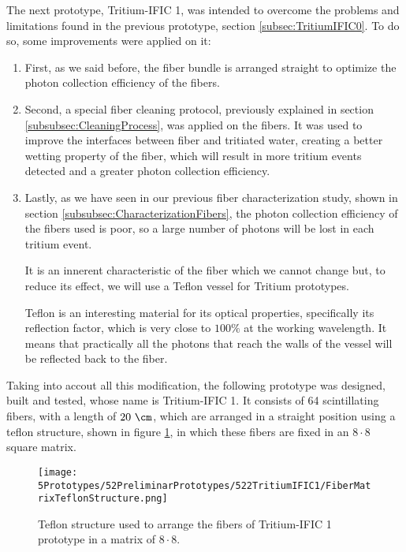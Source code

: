 The next prototype, Tritium-IFIC 1, was intended to overcome the problems and limitations found in the previous prototype, section \ref{subsec:TritiumIFIC0}. To do so, some improvements were applied on it:

\begin{enumerate}

\item{} First, as we said before, the fiber bundle is arranged straight to optimize the photon collection efficiency of the fibers.

\item{} Second, a special fiber cleaning protocol, previously explained in section \ref{subsubsec:CleaningProcess}, was applied on the fibers. It was used to improve the interfaces between fiber and tritiated water, creating a better wetting property of the fiber, which will result in more tritium events detected and a greater photon collection efficiency.

\item{} Lastly, as we have seen in our previous fiber characterization study, shown in section \ref{subsubsec:CharacterizationFibers}, the photon collection efficiency of the fibers used is poor, so a large number of photons will be lost in each tritium event.

It is an innerent characteristic of the fiber which we cannot change but, to reduce its effect, we will use a Teflon vessel for Tritium prototypes.

Teflon is an interesting material for its optical properties, specifically its reflection factor, which is very close to $100\%$ at the working wavelength. It means that practically all the photons that reach the walls of the vessel will be reflected back to the fiber.

\end{enumerate}

Taking into accout all this modification, the following prototype was designed, built and tested, whose name is Tritium-IFIC 1. It consists of 64 scintillating fibers, with a length of $20~\cm$, which are arranged in a straight position using a teflon structure, shown in figure \ref{fig:TeflonStructureFibersTritiumIFIC1}, in which these fibers are fixed in an $8\cdot{}8$ square matrix.

\begin{figure}[h]
\centering
\texttt{[image: 5Prototypes/52PreliminarPrototypes/522TritiumIFIC1/FiberMatrixTeflonStructure.png]}
\caption{Teflon structure used to arrange the fibers of Tritium-IFIC 1 prototype in a matrix of $8\cdot{}8$.\label{fig:TeflonStructureFibersTritiumIFIC1}}
\end{figure}

